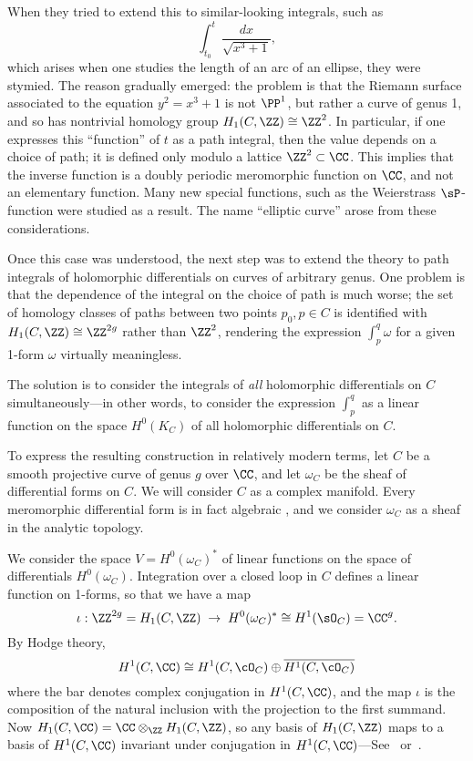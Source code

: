 When they tried to extend this to similar-looking integrals, such as
$$
\int_{t_0}^t \frac{dx}{\sqrt{x^3+1}},
$$
which arises when one studies the length of an arc of an ellipse, they were stymied. The reason gradually emerged: the problem is that the Riemann surface associated to the equation $y^2 = x^3+1$ is not $\PP^1$, but rather a curve of genus 1, and so has nontrivial homology group $H_1(C, \ZZ) \cong \ZZ^2$. In particular, if one expresses this ``function'' of $t$  as a path integral, then the value depends on a choice of path; it is defined only modulo a lattice $\ZZ^2 \subset \CC$. This implies that the inverse function is a doubly periodic meromorphic function on $\CC$, and not an elementary function. Many new special functions, such as the Weierstrass $\sP$-function were studied as a result. The name ``elliptic curve'' arose from these considerations.

Once this case was understood, the next step was to extend the theory to path integrals of holomorphic differentials on curves of arbitrary genus. One problem is that the dependence of the integral on the choice of path is much worse; the set of homology classes of paths between two points $p_0, p \in C$ is identified with $H_1(C,\ZZ) \cong \ZZ^{2g}$ rather than $\ZZ^2$, rendering the expression $\int_p^q \omega$ for a given 1-form $\omega$ virtually meaningless.

The solution is to  consider the integrals of \emph{all} holomorphic differentials on $C$ simultaneously---in other words, to consider the expression $\int_p^q$ as a linear function on the space $H^0(K_C)$ of all holomorphic differentials on $C$.

To express the resulting construction in relatively modern terms, let $C$ be a smooth projective curve of genus $g$ over $\CC$, and let $\omega_{C}$ be the sheaf of differential forms on $C$. We will consider $C$ as a complex manifold. Every meromorphic differential form is in fact algebraic
\cite{SerreGAGA}, and we consider $\omega_{C}$ as a sheaf in the analytic topology.

We consider the space $V = H^0(\omega_C)^*$ of linear functions on the space of differentials $H^0(\omega_C)$.  Integration over a closed loop in $C$ defines a linear function on 1-forms, so that we have a map
$$
\iota: \ZZ^{2g} = H_1(C,\ZZ) \; \to \;  H^0(\omega_C)^* \cong H^1(\sO_C) = \CC^{g}.
$$
By Hodge theory, 
$$
H^1(C, \CC) \cong H^1(C, \cO_C) \oplus \overline{H^1(C, \cO_C)}
$$
where the bar denotes complex conjugation in $H^1(C, \CC)$, and the map $\iota$ is the composition of 
 the natural inclusion with the projection to the first summand.
 Now
$H_1(C,\CC) = \CC\otimes_\ZZ H_1(C,\ZZ)$, so any basis of $H_1(C,\ZZ)$ maps to a basis of 
 $H^1(C, \CC)$ invariant under conjugation in $H^1(C, \CC)$---See~\cite{Voisin} or~\cite[p. 116]{Griffiths-Harris1978}. 

